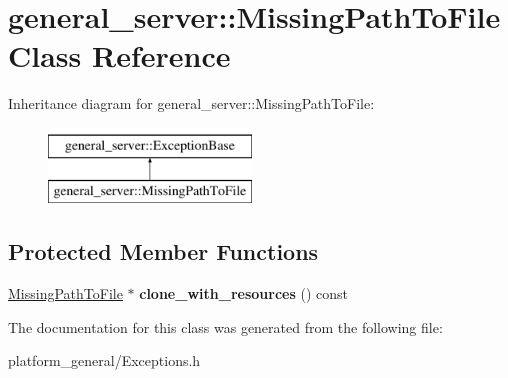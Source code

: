 \hypertarget{classgeneral__server_1_1MissingPathToFile}{\section{general\-\_\-server\-:\-:\-Missing\-Path\-To\-File \-Class \-Reference}
\label{classgeneral__server_1_1MissingPathToFile}
}
\-Inheritance diagram for general\-\_\-server\-:\-:\-Missing\-Path\-To\-File\-:\begin{figure}[H]
\begin{center}
\leavevmode
\includegraphics[height=2.000000cm]{classgeneral__server_1_1MissingPathToFile}
\end{center}
\end{figure}
\subsection*{\-Protected \-Member \-Functions}
\begin{DoxyCompactItemize}
\item 
\hypertarget{classgeneral__server_1_1MissingPathToFile_a1bb13e9cca659d3e0ea9b8521e772039}{\hyperlink{classgeneral__server_1_1MissingPathToFile}{\-Missing\-Path\-To\-File} $\ast$ {\bfseries clone\-\_\-with\-\_\-resources} () const }\label{classgeneral__server_1_1MissingPathToFile_a1bb13e9cca659d3e0ea9b8521e772039}

\end{DoxyCompactItemize}


\-The documentation for this class was generated from the following file\-:\begin{DoxyCompactItemize}
\item 
platform\-\_\-general/\-Exceptions.\-h\end{DoxyCompactItemize}
